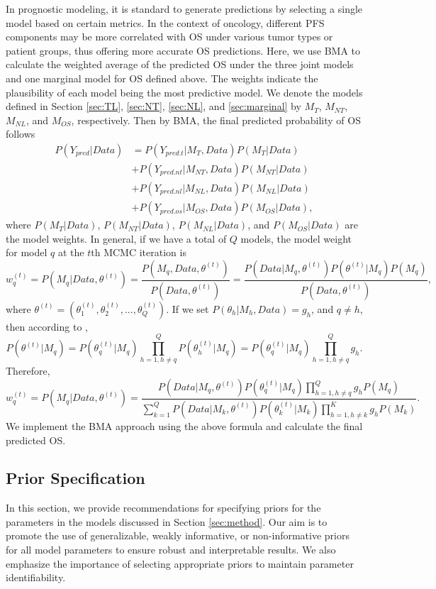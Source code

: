 In prognostic modeling, it is standard to generate predictions by selecting a single model based on certain metrics. In the context of oncology, different \ac{PFS} components may be more correlated with \ac{OS} under various tumor types or patient groups, thus offering more accurate \ac{OS} predictions. Here, we use \ac{BMA} to calculate the weighted average of the predicted \ac{OS} under the three joint models and one marginal model for \ac{OS} defined above. The weights indicate the plausibility of each model being the most predictive model. We denote the models defined in Section \ref{sec:TL}, \ref{sec:NT}, \ref{sec:NL}, and \ref{sec:marginal} by $M_T$, $M_{NT}$, $M_{NL}$, and $M_{OS}$, respectively. Then by BMA, the final predicted probability of \ac{OS} follows
\begin{align*}
P(Y_{pred}|Data)&=P(Y_{pred.t}|M_T,Data)P(M_T|Data)\\
&+P(Y_{pred.nt}|M_{NT},Data)P(M_{NT}|Data)\\
&+P(Y_{pred.nl}|M_{NL},Data)P(M_{NL}|Data)\\
&+P(Y_{pred.os}|M_{OS},Data)P(M_{OS}|Data),
\end{align*}
where $P(M_T|Data)$, $P(M_{NT}|Data)$, $P(M_{NL}|Data)$, and $P(M_{OS}|Data)$ are the model weights. In general, if we have a total of $Q$ models, the model weight for model $q$ at the $t$th \ac{MCMC}  iteration is  
$$w^{(t)}_q=P(M_q|Data,\theta^{(t)})=\frac{P(M_q,Data,\theta^{(t)})}{P(Data,\theta^{(t)})} =\frac{P(Data|M_q,\theta^{(t)})P(\theta^{(t)}|M_q)P(M_q)}{P(Data,\theta^{(t)})},$$
where $\theta^{(t)} = (\theta_1^{(t)}, \theta_2^{(t)},...,\theta_Q^{(t)})$. If we set $P(\theta_h|M_h, Data)=g_h$, and $q \ne h$, then according to \cite{congdon2007model},
$$P(\theta^{(t)}|M_q)=P(\theta_q^{(t)}|M_q) \prod_{h=1,h\ne q}^Q P(\theta_h^{(t)}|M_q)=P(\theta_q^{(t)}|M_q) \prod_{h=1,h\ne q}^Q g_h.$$
Therefore, 
$$w^{(t)}_q=P(M_q|Data,\theta^{(t)})=\frac{P(Data|M_q,\theta^{(t)}) P(\theta_q^{(t)}|M_q) \prod_{h=1,h\ne q}^Q g_h P(M_q) }{\sum_{k=1}^Q P(Data|M_k,\theta^{(t)}) P(\theta_k^{(t)}|M_k) \prod_{h=1,h\ne k}^K g_h P(M_k)}.
$$
We implement the \ac{BMA} approach using the above formula and calculate the final predicted OS. 



\subsection{Prior Specification}

In this section, we provide recommendations for specifying priors for the parameters in the models discussed in Section \ref{sec:method}. Our aim is to promote the use of generalizable, weakly informative, or non-informative priors for all model parameters to ensure robust and interpretable results. We also emphasize the importance of selecting appropriate priors to maintain parameter identifiability.

